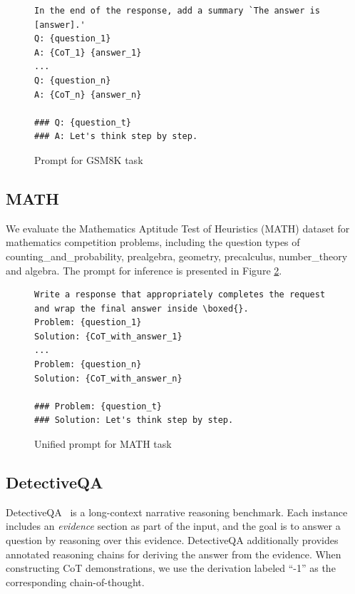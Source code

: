 \documentclass{llmxive}
\begin{document}
\begin{figure}[ht]
    \centering
    {\tiny
\begin{lstlisting}
In the end of the response, add a summary `The answer is [answer].'
Q: {question_1}
A: {CoT_1} {answer_1}
...
Q: {question_n}
A: {CoT_n} {answer_n}

### Q: {question_t}
### A: Let's think step by step.
\end{lstlisting}
}
    \caption{Prompt for GSM8K task}
    \label{fig:prompt_gsm8k}
\end{figure}




\subsection{MATH}
We evaluate the Mathematics Aptitude Test of Heuristics (MATH) dataset for mathematics competition problems, including the question types of counting\_and\_probability, prealgebra, geometry, precalculus, number\_theory and algebra. The prompt for inference is presented in Figure \ref{fig:prompt_math}. %

\begin{figure}[ht]
    \centering
    {\tiny
\begin{lstlisting}
Write a response that appropriately completes the request and wrap the final answer inside \boxed{}.
Problem: {question_1}
Solution: {CoT_with_answer_1}
...
Problem: {question_n}
Solution: {CoT_with_answer_n}

### Problem: {question_t}
### Solution: Let's think step by step.
\end{lstlisting}
}
    \caption{Unified prompt for MATH task}
    \label{fig:prompt_math}
\end{figure}





\subsection{DetectiveQA}
DetectiveQA~\cite{xu2025detectiveqaevaluatinglongcontextreasoning} is a long-context narrative reasoning benchmark. Each instance includes an \emph{evidence} section as part of the input, and the goal is to answer a question by reasoning over this evidence. DetectiveQA additionally provides annotated reasoning chains for deriving the answer from the evidence. When constructing CoT demonstrations, we use the derivation labeled ``-1'' as the corresponding chain-of-thought.
\end{document}

